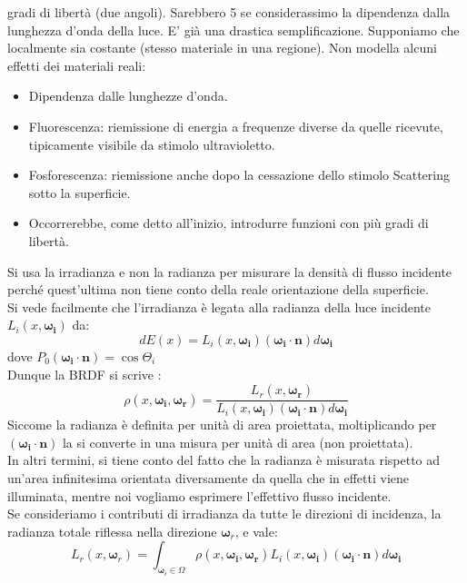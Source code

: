 \documentclass[a4paper, 10pt]{article}
\renewcommand{\vec}{\bm}
\begin{document}
		 gradi di libertà (due angoli). Sarebbero 5 se considerassimo
		la dipendenza dalla lunghezza d'onda della luce.
		E' già una drastica semplificazione.
		Supponiamo che localmente sia costante (stesso materiale in
		una regione).
		Non modella alcuni effetti dei materiali reali:
	\begin{itemize}
		\item Dipendenza dalle lunghezze d'onda.
		\item Fluorescenza: riemissione di energia a frequenze diverse da quelle
		ricevute, tipicamente visibile da stimolo ultravioletto.
		\item Fosforescenza: riemissione anche dopo la cessazione dello stimolo
		Scattering sotto la superficie.
		\item Occorrerebbe, come detto all'inizio, introdurre funzioni con più gradi
		di libertà.
	\end{itemize}
		Si usa la irradianza e non la radianza per misurare la densità di
		flusso incidente perché quest’ultima non tiene conto della
		reale orientazione della superficie.\\
		Si vede facilmente che l'irradianza è legata alla radianza della
		luce incidente $ L_i (x, \vec{\omega_i} ) $ da:
		\[
			dE(x) = L_i (x, \vec{\omega_i} )(\vec{\omega_i} \cdot \vec{n}) d\vec{\omega_i}
		\]
		dove $ P_0 (\vec{\omega_i} \cdot \vec{n}) = \cos\Theta_i $\\
		Dunque la BRDF si scrive :
		\[
			\rho(x, \vec{\omega_i}, \vec{\omega_r}) = 
			\dfrac{L_r (x, \vec{\omega_r})}{L_i (x, \vec{\omega_i} )(\vec{\omega_i} \cdot \vec{n}) d\vec{\omega_i}}
		\]
		Siccome la radianza è definita per unità di area proiettata,
		moltiplicando per $ (\vec{\omega_i} \cdot \vec{n}) $ la si converte in una misura per
		unità di area (non proiettata).\\
		In altri termini, si tiene conto del fatto che la radianza è
		misurata rispetto ad un’area infinitesima orientata
		diversamente da quella che in effetti viene illuminata, mentre
		noi vogliamo esprimere l’effettivo flusso incidente.\\
		Se consideriamo i contributi di irradianza da tutte le direzioni
		di incidenza, la radianza totale riflessa nella direzione $ \vec{\omega}_r $, e
		vale:
		\[
			L_r (x, \vec{\omega}_r) = \int_{\vec{\omega}_i \in \Omega} 
			\rho(x, \vec{\omega_i}, \vec{\omega_r}) L_i (x, \vec{\omega_i} )(\vec{\omega_i} \cdot \vec{n}) d\vec{\omega_i}
		\]
		
\end{document}
